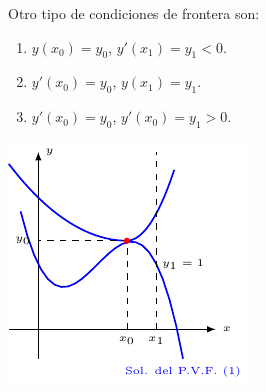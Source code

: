 \documentclass{beamer}
\begin{document}
\begin{frame}[t]
	\begin{block}{}
		Otro tipo de condiciones de frontera son:\\
		\begin{minipage}{0.3\linewidth}
			\begin{enumerate}
					\footnotesize 
				\item \(y(x_0) =y_0\), \(y' (x_1) =y_1 < 0.\)
				\item \(y'(x_0)=y_0\), \(y(x_1) =y_1\).
				\item \(y' (x_0) =y_0\), \(y'(x_0) =y_1 >0\).
			\end{enumerate}
		\end{minipage}\hspace{5mm}
		\begin{minipage}{0.6\linewidth}
			\includegraphics[width= \linewidth]{IMAGENES/5/tikz.pdf}
		\end{minipage}
	\end{block}
\end{frame}
\end{document}
